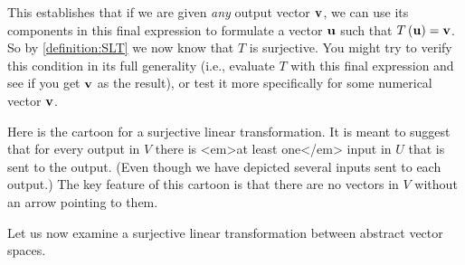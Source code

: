 \documentclass{ximera}
\begin{document}
\begin{example}
This establishes that if we are given \textit{any} output vector $\mathbf{v}$, we can use its components in this final expression to formulate a vector $\mathbf{u}$ such that $T\left(\mathbf{u}\right)=\mathbf{v}$.  So by \ref{definition:SLT} we now know that $T$ is surjective.  You might try to verify this condition in its full generality (i.e.,  evaluate $T$ with this final expression and see if you get $\mathbf{v}$ as the result), or test it more specifically for some numerical vector $\mathbf{v}$.

\end{example}

Here is the cartoon for a surjective linear transformation.  It is meant to suggest that for every output in $V$ there is <em>at least one</em> input in $U$ that is sent to the output.  (Even though we have depicted several inputs sent to each output.)  The key feature of this cartoon is that there are no vectors in $V$ without an arrow pointing to them.
\begin{image}
\end{image}

Let us now examine a surjective linear transformation between abstract vector spaces.
\end{document}
